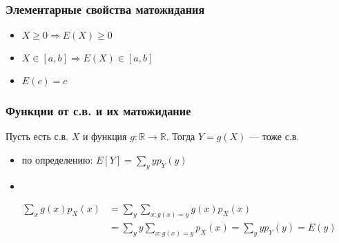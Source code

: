 \documentclass[hyperref=unicode,graphics=pdflatex,13pt,xcolor={usenames,dvipsnames}]{beamer}
\renewcommand\emph[1]{{\color{blue}{#1}}}
\newcommand\pitem{\pause\item}
\newcommand\R{\mathbb{R}}
\begin{document}
\begin{frame}
  \frametitle{Элементарные свойства матожидания}
  \begin{itemize}
    \item \emph{Неотрицательность:} $X \ge 0 \Rightarrow E(X) \ge 0$
    \item \emph{Ограниченность:} $X \in [a, b] \Rightarrow E(X) \in [a, b]$
    \item \emph{Матожидание константы:} $E(c) = c$
  \end{itemize}
\end{frame}

\begin{frame}
  \frametitle{Функции от с.в. и их матожидание}

  Пусть есть с.в. $X$ и функция $g: \R \to \R$. Тогда $Y = g(X)$ --- тоже с.в.

  \emph{Как посчитать $E(Y)$?}

  \begin{itemize}
    \pitem по определению: $E[Y] = \sum_y y p_Y(y)$
    \pitem 
  \end{itemize}
  
  \pause

  \begin{align*}
    \sum_x g(x)p_X(x) &= \sum_y \sum_{x: g(x) = y} g(x) p_X(x) \\
                      &= \sum_y y  \sum_{x: g(x) = y} p_X(x) = \sum_y y p_Y(y) = E(y)
  \end{align*}


\end{frame}
\end{document}
